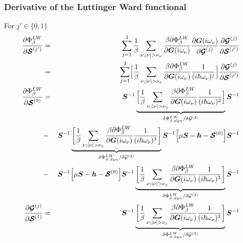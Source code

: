 \documentclass[11pt,a4paper]{report}
\begin{document}
\subsubsection{Derivative of the Luttinger Ward functional}
For $j'\in\{0,1\}$
\begin{eqnarray}
\frac{\partial\Phi^{LW}_\beta}{\partial \mat{\mathcal{S}}^{(j')}}
&=&
\sum_{j=1}^3
\frac{1}{\beta}\sum_{\nu; |\nu|>\nu_x}
\frac{\beta\partial\Phi^{LW}_\beta}{\partial \mat{G}(i\omega_\nu)}
\frac{\partial \mat{G}(i\omega_\nu)}{\partial \mat{\mathcal{G}}^{(j)}}
\frac{\partial \mat{\mathcal{G}}^{(j)}}{\partial \mat{\mathcal{S}}^{(j')}}
\nonumber\\
&=&
\sum_{j=1}^3
\Bigl[\frac{1}{\beta}\sum_{\nu; |\nu|>\nu_x}
\frac{\beta\partial\Phi^{LW}_\beta}{\partial \mat{G}(i\omega_\nu)}
\frac{1}{(i\hbar\omega_\nu)^j}\Bigr]
\frac{\partial \mat{\mathcal{G}}^{(j)}}{\partial \mat{\mathcal{S}}^{(j')}}
\nonumber\\
\frac{\partial\Phi^{LW}_\beta}{\partial \mat{\mathcal{S}}^{(0)}}
&=&
\mat{S}^{-1}
\underbrace{\Bigl[\frac{1}{\beta}\sum_{\nu; |\nu|>\nu_x}
\frac{\beta\partial\Phi^{LW}_\beta}{\partial \mat{G}(i\omega_\nu)}
\frac{1}{(i\hbar\omega_\nu)^2}\Bigr]}
_{\delta\Phi^{LW}_{\beta,dyn}/\delta\mathcal{\mat{G}}^{(2)}}
\mat{S}^{-1}
\nonumber\\
&-&
\mat{S}^{-1}
\underbrace{\biggl[\frac{1}{\beta}\sum_{\nu; |\nu|>\nu_x}
\frac{\beta\partial\Phi^{LW}_\beta}{\partial \mat{G}(i\omega_\nu)}
\frac{1}{(i\hbar\omega_\nu)^3}\biggr]}
_{\delta\Phi^{LW}_{\beta,dyn}/\delta\mathcal{\mat{G}}^{(3)}}
\mat{S}^{-1}\Bigl[\mu\mat{S}-\mat{h}-\mat{\mathcal{S}}^{(0)}\Bigr]\mat{S}^{-1}
\nonumber\\
&-&
\mat{S}^{-1}
\Bigl[\mu\mat{S}-\mat{h}-\mat{\mathcal{S}}^{(0)}\Bigr]\mat{S}^{-1}
\underbrace{\biggl[\frac{1}{\beta}\sum_{\nu; |\nu|>\nu_x}
\frac{\beta\partial\Phi^{LW}_\beta}{\partial \mat{G}(i\omega_\nu)}
\frac{1}{(i\hbar\omega_\nu)^3}\biggr]}
_{\delta\Phi^{LW}_{\beta,dyn}/\delta\mathcal{\mat{G}}^{(3)}}
\mat{S}^{-1}
%
\nonumber\\
\frac{\partial \mat{\mathcal{G}}^{(j)}}{\partial \mat{\mathcal{S}}^{(1)}}
&=&\mat{S}^{-1}
\underbrace{\biggl[\frac{1}{\beta}\sum_{\nu; |\nu|>\nu_x}
\frac{\beta\partial\Phi^{LW}_\beta}{\partial \mat{G}(i\omega_\nu)}
\frac{1}{(i\hbar\omega_\nu)^3}\biggr]}
_{\delta\Phi^{LW}_{\beta,dyn}/\delta\mathcal{\mat{G}}^{(3)}}
\mat{S}^{-1}
\end{eqnarray}
\end{document}
